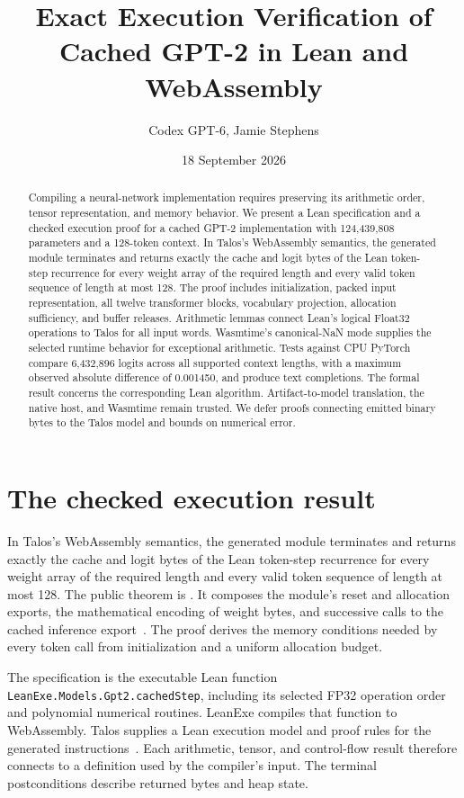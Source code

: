 \documentclass[11pt]{article}
\title{Exact Execution Verification of Cached GPT-2 in Lean and WebAssembly}
\author{Codex GPT-6, Jamie Stephens}
\date{18 September 2026}
\newcommand{\code}[1]{\texttt{#1}}
\newcommand{\longcode}[1]{\texttt{\seqsplit{#1}}}
\begin{document}
\maketitle
\begin{abstract}
Compiling a neural-network implementation requires preserving its arithmetic order, tensor representation, and memory behavior.  We present a Lean specification and a checked execution proof for a cached GPT-2 implementation with 124,439,808 parameters and a 128-token context.  In Talos's WebAssembly semantics, the generated module terminates and returns exactly the cache and logit bytes of the Lean token-step recurrence for every weight array of the required length and every valid token sequence of length at most 128.  The proof includes initialization, packed input representation, all twelve transformer blocks, vocabulary projection, allocation sufficiency, and buffer releases.  Arithmetic lemmas connect Lean's logical Float32 operations to Talos for all input words.  Wasmtime's canonical-NaN mode supplies the selected runtime behavior for exceptional arithmetic.  Tests against CPU PyTorch compare 6,432,896 logits across all supported context lengths, with a maximum observed absolute difference of 0.001450, and produce text completions.  The formal result concerns the corresponding Lean algorithm.  Artifact-to-model translation, the native host, and Wasmtime remain trusted.  We defer proofs connecting emitted binary bytes to the Talos model and bounds on numerical error.
\end{abstract}

\section{The checked execution result}

In Talos's WebAssembly semantics, the generated module terminates and returns exactly the cache and logit bytes of the Lean token-step recurrence for every weight array of the required length and every valid token sequence of length at most 128.  The public theorem is \longcode{Project.Gpt2CachedStep.Spec.gpt2\_128\_exact}.  It composes the module's reset and allocation exports, the mathematical encoding of weight bytes, and successive calls to the cached inference export~\cite{session}.  The proof derives the memory conditions needed by every token call from initialization and a uniform allocation budget.

The specification is the executable Lean function \code{LeanExe.Models.Gpt2.cachedStep}, including its selected FP32 operation order and polynomial numerical routines.  LeanExe compiles that function to WebAssembly.  Talos supplies a Lean execution model and proof rules for the generated instructions~\cite{subset,talos}.  Each arithmetic, tensor, and control-flow result therefore connects to a definition used by the compiler's input.  The terminal postconditions describe returned bytes and heap state.
\end{document}
